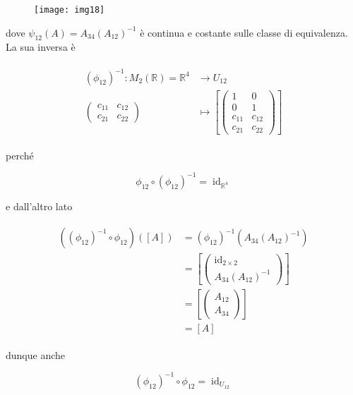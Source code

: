 \begin{figure}[H]
	\centering
	\texttt{[image: img18]}
\end{figure}

dove $ \psi_{12}(A) = A_{34} (A_{12})^{-1} $ è continua e costante sulle classe di equivalenza.\\
La sua inversa è

\begin{align}
	\begin{split}
		(\phi_{12})^{-1} : M_{2}(\mathbb{R}) = \mathbb{R}^{4} &\to U_{12}\\
		\begin{pmatrix} c_{11} & c_{12} \\ c_{21} & c_{22} \end{pmatrix} &\mapsto \left[ \begin{pmatrix} 1 & 0 \\ 0 & 1 \\ c_{11} & c_{12} \\ c_{21} & c_{22} \end{pmatrix} \right]
	\end{split}
\end{align}

perché

\begin{equation}
	\phi_{12} \circ (\phi_{12})^{-1} = \operatorname{id}_{\mathbb{R}^{4}}
\end{equation}

e dall'altro lato

\begin{align}
	\begin{split}
		((\phi_{12})^{-1} \circ \phi_{12})([A]) &= (\phi_{12})^{-1}(A_{34} (A_{12})^{-1})\\
		&= \left[ \begin{pmatrix} \operatorname{id}_{2 \times 2} \\ A_{34} (A_{12})^{-1} \end{pmatrix} \right]\\
		&= \left[ \begin{pmatrix} A_{12} \\ A_{34} \end{pmatrix} \right]\\
		&= [A]
	\end{split}
\end{align}

dunque anche

\begin{equation}
	(\phi_{12})^{-1} \circ \phi_{12} = \operatorname{id}_{U_{12}}
\end{equation}

